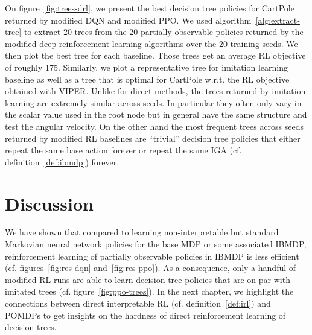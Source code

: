 On figure~\ref{fig:trees-drl}, we present the best decision tree policies for CartPole returned by modified DQN and modified PPO.
We used algorithm~\ref{alg:extract-tree} to extract 20 trees from the 20 partially observable policies returned by the modified deep reinforcement learning algorithms over the 20 training seeds.
We then plot the best tree for each baseline.
Those trees get an average RL objective of roughly 175.
Similarly, we plot a representative tree for imitation learning baseline as well as a tree that is optimal for CartPole w.r.t. the RL objective obtained with VIPER. 
Unlike for direct methods, the trees returned by imitation learning are extremely similar across seeds. In particular they often only vary in the scalar value used in the root node but in general have the same structure and test the angular velocity.
On the other hand the most frequent trees across seeds returned by modified RL baselines are ``trivial'' decision tree policies that either repeat the same base action forever or repeat the same IGA (cf. definition~\ref{def:ibmdp}) forever.


\section{Discussion}
We have shown that compared to learning non-interpretable but standard Markovian neural network policies for the base MDP or some associated IBMDP, reinforcement learning of partially observable policies in IBMDP is less efficient (cf. figures~\ref{fig:res-dqn} and~\ref{fig:res-ppo}). 
As a consequence, only a handful of modified RL runs are able to learn decision tree policies that are on par with imitated trees (cf. figure~\ref{fig:ppo-trees}).
In the next chapter, we highlight the connections between direct interpretable RL (cf. definition~\ref{def:irl}) and POMDPs to get insights on the hardness of direct reinforcement learning of decision trees.